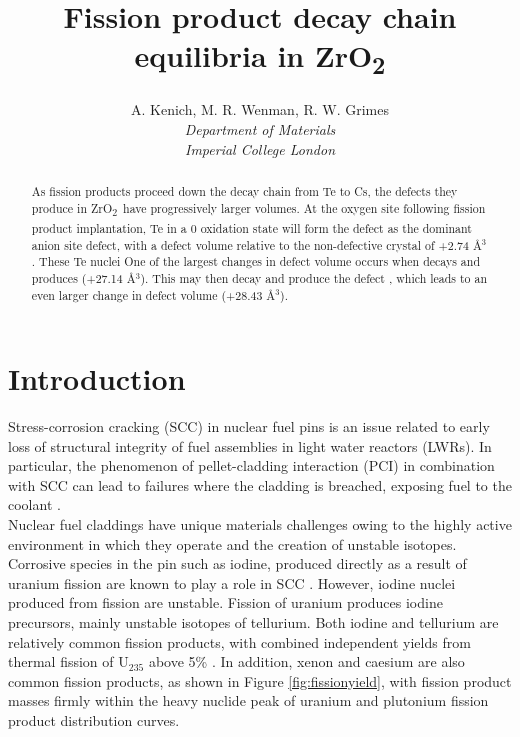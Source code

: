 \documentclass[11pt,a4paper]{article}
\newcommand{\zirconia}{ZrO\textsubscript{2}}
\begin{document}
\title{Fission product decay chain equilibria in \zirconia}
\author{A. Kenich, M. R. Wenman, R. W. Grimes\\ \emph{Department of Materials} \\ \emph{Imperial College London}}

\maketitle

\begin{abstract}

As fission products proceed down the decay chain from Te to Cs, the defects they produce in \zirconia\ have progressively larger volumes. At the oxygen site following fission product implantation, Te in a 0 oxidation state will form the defect  as the dominant anion site defect, with a defect volume relative to the non-defective crystal of +2.74 \r{A}$^{3}$. These Te nuclei  One of the largest changes in defect volume occurs when  decays and produces  (+27.14 \r{A}$^{3}$). This may then decay and produce the defect , which leads to an even larger change in defect volume (+28.43 \r{A}$^{3}$).

\end{abstract}

\section{Introduction}


Stress-corrosion cracking (SCC) in nuclear fuel pins is an issue related to early loss of structural integrity of fuel assemblies in light water reactors (LWRs). In particular, the phenomenon of pellet-cladding interaction (PCI) in combination with SCC can lead to failures where the cladding is breached, exposing fuel to the coolant \cite{bcoxpelletclad1990}.     \\

Nuclear fuel claddings have unique materials challenges owing to the highly active environment in which they operate and the creation of unstable isotopes. Corrosive species in the pin such as iodine, produced directly as a result of uranium fission are known to play a role in SCC \cite{Sidky1998, Fregonese1998, iodinezrmetal}. However, iodine nuclei produced from fission are unstable. Fission of uranium produces iodine precursors, mainly unstable isotopes of tellurium. Both iodine and tellurium are relatively common fission products, with combined independent yields from thermal fission of U$_{235}$ above 5\% \cite{kennett1956mass, iodine129fissionyield, imanishi1976independent, iaeafissionyield, iodine132, amiel1975odd}. In addition, xenon and caesium are also common fission products, as shown in Figure \ref{fig:fissionyield}, with fission product masses firmly within the heavy nuclide peak of uranium and plutonium fission product distribution curves.    \\
\end{document}
